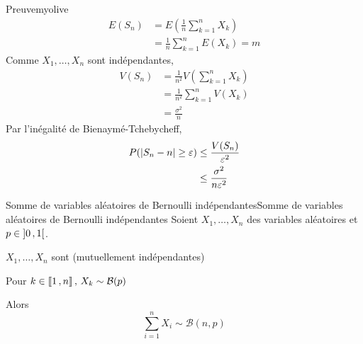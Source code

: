     \begin{demo}{Preuve}{myolive}
        \begin{align*}
            E(S_n) &= E\left(\frac{1}{n} \sum\limits_{k=1}^n X_k\right) \\
            &= \frac{1}{n} \sum\limits_{k=1}^n E(X_k) = m
        \end{align*}
        Comme $X_1,\ldots,X_n$ sont indépendantes,
        \begin{align*}
            V(S_n) &= \frac{1}{n^2} V(\sum\limits_{k=1}^n X_k) \\
            &= \frac{1}{n^2} \sum\limits_{k=1}^n V(X_k) \\
            &= \frac{\sigma^2}{n}
        \end{align*}
        Par l’inégalité de Bienaymé-Tchebycheff, 
        \begin{align*}
            P(\left\lvert S_n-n\right\rvert \geq \varepsilon) & \leq \frac{V(S_n)}{\varepsilon^2} \\
            & \leq \frac{\sigma^2}{n \varepsilon^2}
        \end{align*}
    \end{demo}

    \begin{prop}{Somme de variables aléatoires de Bernoulli indépendantes}{Somme de variables aléatoires de Bernoulli indépendantes}
        Soient $X_1,\ldots,X_n$ des variables aléatoires et $p \in \left] 0 \, , 1 \right[$.

        \begin{suppose}
            \item $X_1,\ldots,X_n$ sont (mutuellement indépendantes)
            \item Pour $k \in \left\llbracket 1 \, , n \right\rrbracket, \, X_k \sim \mathcal{B}(p)$
        \end{suppose}

        Alors 
        \[ \sum\limits_{i=1}^n X_i \sim \mathcal{B}(n,p) \] 
    \end{prop}

